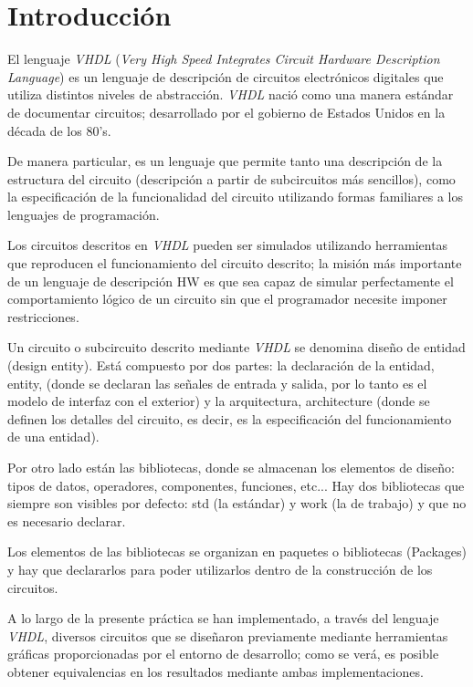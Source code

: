\documentclass[../main.tex]{subfiles}
\begin{document}
\clearpage
\section{Introducción}
El lenguaje \textit{VHDL} (\textit{Very High Speed Integrates Circuit Hardware 
Description Language}) es un lenguaje de descripción de circuitos electrónicos 
digitales que utiliza distintos niveles de abstracción. \textit{VHDL} nació 
como una manera estándar de documentar circuitos; desarrollado por el gobierno 
de Estados Unidos en la década de los 80’s.

De manera particular, es un lenguaje que permite tanto una descripción de la 
estructura del circuito (descripción a partir de subcircuitos más sencillos), 
como la especificación de la funcionalidad del circuito utilizando formas 
familiares a los lenguajes de programación.

Los circuitos descritos en \textit{VHDL} pueden ser simulados utilizando 
herramientas que reproducen el funcionamiento del circuito descrito; la misión 
más importante de un lenguaje de descripción HW es que sea capaz de simular 
perfectamente el comportamiento lógico de un circuito sin que el programador 
necesite imponer restricciones.

Un circuito o subcircuito descrito mediante \textit{VHDL} se denomina diseño 
de entidad (design entity). Está compuesto por dos partes: la declaración de 
la entidad, entity, (donde se declaran las señales de entrada y salida, por lo 
tanto es el modelo de interfaz con el exterior) y la arquitectura, 
architecture (donde se definen los detalles del circuito, es decir, es la 
especificación del funcionamiento de una entidad).

Por otro lado están las bibliotecas, donde se almacenan los elementos de 
diseño: tipos de datos, operadores, componentes, funciones, etc...
Hay dos bibliotecas que siempre son visibles por defecto: std (la estándar) y 
work (la de trabajo) y que no es necesario declarar.

Los elementos de las bibliotecas se organizan en paquetes o bibliotecas 
(Packages) y hay que declararlos para poder utilizarlos dentro de la 
construcción de los circuitos.

A lo largo de la presente práctica se han implementado, a través del lenguaje 
\textit{VHDL}, diversos circuitos que se diseñaron previamente mediante 
herramientas gráficas proporcionadas por el entorno de desarrollo; como se 
verá, es posible obtener equivalencias en los resultados mediante ambas 
implementaciones.
\end{document}
